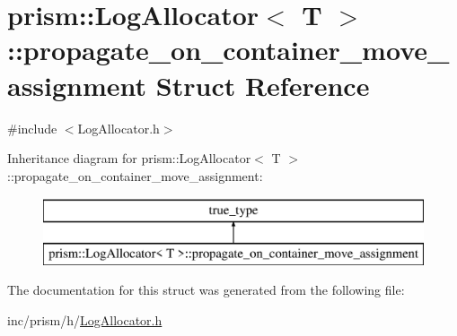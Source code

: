 \hypertarget{structprism_1_1_log_allocator_1_1propagate__on__container__move__assignment}{}\section{prism\+:\+:Log\+Allocator$<$ T $>$\+:\+:propagate\+\_\+on\+\_\+container\+\_\+move\+\_\+assignment Struct Reference}
\label{structprism_1_1_log_allocator_1_1propagate__on__container__move__assignment}


{\ttfamily \#include $<$Log\+Allocator.\+h$>$}

Inheritance diagram for prism\+:\+:Log\+Allocator$<$ T $>$\+:\+:propagate\+\_\+on\+\_\+container\+\_\+move\+\_\+assignment\+:\begin{figure}[H]
\begin{center}
\leavevmode
\includegraphics[height=2.000000cm]{structprism_1_1_log_allocator_1_1propagate__on__container__move__assignment}
\end{center}
\end{figure}


The documentation for this struct was generated from the following file\+:\begin{DoxyCompactItemize}
\item 
inc/prism/h/\hyperlink{_log_allocator_8h}{Log\+Allocator.\+h}\end{DoxyCompactItemize}
